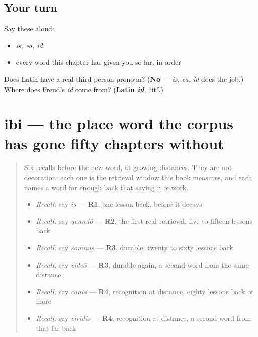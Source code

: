 \subsection*{Your turn}
Say these aloud:

\begin{itemize}
\raggedright
  \item \emph{is, ea, id}
  \item every word this chapter has given you so far, in order
\end{itemize}

\begin{tcolorbox}[breakable,colback=teal!4,colframe=teal!35!black,title={Before you move on}]
Does Latin have a real third-person pronoun? (\textbf{No} — \emph{is, ea, id} does the job.) Where does Freud's \emph{id} come from? (\textbf{Latin \emph{id}}, \textquotedblleft{}it\textquotedblright{}.)
\end{tcolorbox}
\section[ibi]{ibi — the place word the corpus has gone fifty chapters without}

\label{lesson:LA-C50-ibi}



\begin{quote}
Six recalls before the new word, at growing distances. They are not decoration: each one is the retrieval window this book measures, and each names a word far enough back that saying it is work.

\begin{itemize}
\raggedright
  \item \emph{Recall:} say \emph{is} — \textbf{R1}, one lesson back, before it decays
  \item \emph{Recall:} say \emph{quandō} — \textbf{R2}, the first real retrieval, five to fifteen lessons back
  \item \emph{Recall:} say \emph{somnus} — \textbf{R3}, durable, twenty to sixty lessons back
  \item \emph{Recall:} say \emph{videō} — \textbf{R3}, durable again, a second word from the same distance
  \item \emph{Recall:} say \emph{canis} — \textbf{R4}, recognition at distance, eighty lessons back or more
  \item \emph{Recall:} say \emph{viridis} — \textbf{R4}, recognition at distance, a second word from that far back
\end{itemize}
\end{quote}

